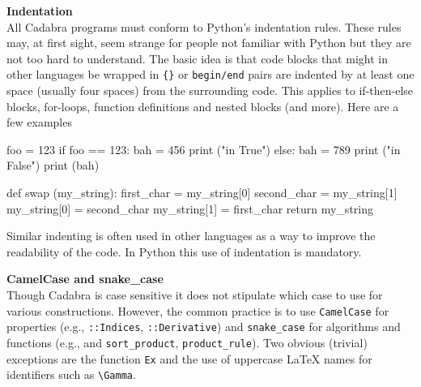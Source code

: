 \documentclass[a4paper,12pt]{article}
\numberwithin{equation}{section}%
\begin{document}
{\bf Indentation}\\[5pt]
All Cadabra programs must conform to Python's indentation rules. These rules may,
at first sight, seem strange for people not familiar with Python but they are not
too hard to understand. The basic idea is that code blocks that might in other
languages be wrapped in \verb|{}| or \verb|begin/end| pairs are indented by at least
one space (usually four spaces) from the surrounding code. This applies to
if-then-else blocks, for-loops, function definitions and nested blocks (and more).
Here are a few examples
\begin{cadabra}[numbers=none]
   foo = 123
   if foo == 123:
      bah = 456
      print ("in True")
   else:
      bah = 789
      print ("in False")
   print (bah)

   def swap (my_string):
       first_char   = my_string[0]
       second_char  = my_string[1]
       my_string[0] = second_char
       my_string[1] = first_char
       return my_string
\end{cadabra}
Similar indenting is often used in other languages as a way to improve the
readability of the code. In Python this use of indentation is mandatory.

{\bf CamelCase and snake\_case}\\[5pt]
Though Cadabra is case sensitive it does not stipulate which case to use for various
constructions. However, the common practice is to use \verb|CamelCase| for properties (e.g.,
\verb|::Indices|, \verb|::Derivative|) and \verb|snake_case| for algorithms and
functions (e.g., and \verb|sort_product|, \verb|product_rule|). Two obvious (trivial)
exceptions are the function \verb|Ex| and the use of uppercase LaTeX names for identifiers
such as \verb|\Gamma|.
\end{document}
